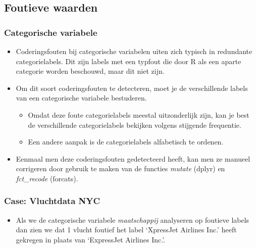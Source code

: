 \documentclass[]{tufte-book}
\providecommand{\tightlist}{%
  \setlength{\itemsep}{0pt}\setlength{\parskip}{0pt}}
\begin{document}
\hypertarget{foutieve-waarden}{%
\subsection{Foutieve waarden}\label{foutieve-waarden}}

\hypertarget{categorische-variabele-2}{%
\subsubsection{Categorische variabele}\label{categorische-variabele-2}}

\begin{itemize}
\tightlist
\item
  Coderingsfouten bij categorische variabelen uiten zich typisch in redundante categorielabels. Dit zijn labels met een typfout die door R als een aparte categorie worden beschouwd, maar dit niet zijn.
\item
  Om dit soort coderingsfouten te detecteren, moet je de verschillende labels van een categorische variabele bestuderen.

  \begin{itemize}
  \tightlist
  \item
    Omdat deze foute categorielabels meestal uitzonderlijk zijn, kan je best de verschillende categorielabels bekijken volgens stijgende frequentie.
  \item
    Een andere aanpak is de categorielabels alfabetisch te ordenen.
  \end{itemize}
\item
  Eenmaal men deze coderingsfouten gedetecteerd heeft, kan men ze manueel corrigeren door gebruik te maken van de functies \emph{mutate} (dplyr) en \emph{fct\_recode} (forcats).
\end{itemize}

\hypertarget{case-vluchtdata-nyc}{%
\subsubsection*{Case: Vluchtdata NYC}\label{case-vluchtdata-nyc}}

\begin{itemize}
\tightlist
\item
  Als we de categorische variabele \emph{maatschappij} analyseren op foutieve labels dan zien we dat 1 vlucht foutief het label `XpressJet Airlines Inc.' heeft gekregen in plaats van `ExpressJet Airlines Inc.'.
\end{itemize}
\end{document}
